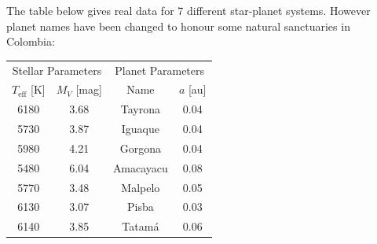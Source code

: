 The table below gives real data for 7 different star-planet systems. However
planet names have been changed to honour some natural sanctuaries in Colombia:

\begin{center}
\begin{tabular}{cc cc}
\toprule
\multicolumn{2}{c}{Stellar Parameters} & \multicolumn{2}{c}{Planet Parameters}\\
$T_{\mathrm{eff}}$ [K] & $M_V$ [mag] & Name & $a$ [au]\\
\midrule
6180 & 3.68 & Tayrona   & 0.04\\
5730 & 3.87 & Iguaque   & 0.04\\
5980 & 4.21 & Gorgona   & 0.04\\
5480 & 6.04 & Amacayacu & 0.08\\
5770 & 3.48 & Malpelo   & 0.05\\
6130 & 3.07 & Pisba     & 0.03\\
6140 & 3.85 & Tatam\'a  & 0.06\\
\bottomrule
\end{tabular}
\end{center}

